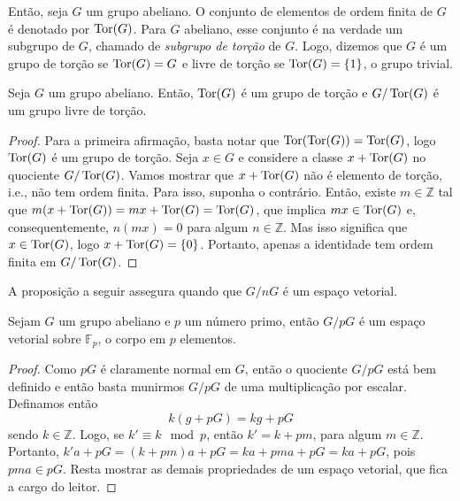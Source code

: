     	\par\vspace{0.3cm} Então, seja $G$ um grupo abeliano. O conjunto de elementos de ordem finita de 
    	$G$ é denotado por $\operatorname{Tor}(G)$. Para $G$ abeliano, esse conjunto é na verdade um subgrupo de $G$, 
    	chamado de \textit{subgrupo de torção} de $G$. Logo, dizemos que $G$ é um grupo de torção se 
    	$\operatorname{Tor}(G) = G$ e livre de torção se $\operatorname{Tor}(G) = \left\{1\right\}$, o grupo trivial.
    	\begin{lemma}
    	\label{quociente por tor}
    		Seja $G$ um grupo abeliano. Então, $\operatorname{Tor}(G)$ é um grupo de torção e $G/\operatorname{Tor}(G)$ é um 
    		grupo livre de torção.
    	\end{lemma}
    	\begin{proof}
    		Para a primeira afirmação, basta notar que $\operatorname{Tor}(\operatorname{Tor}(G)) = \operatorname{Tor}(G)$, logo $\operatorname{Tor}(G)$ é um grupo 
    		de torção. Seja $x\in G$ e considere a classe $x + \operatorname{Tor}(G)$ no quociente $G/\operatorname{Tor}(G)$. Vamos mostrar
    		que $x + \operatorname{Tor}(G)$ não é elemento de torção, i.e., não tem ordem finita. Para isso, suponha o
    		contrário. Então, existe $m\in\mathbb{Z}$ tal que $m( x+\operatorname{Tor}(G) ) = mx + \operatorname{Tor}(G) = \operatorname{Tor}(G)$, que
    		implica $mx\in\operatorname{Tor}(G)$ e, consequentemente, $n(mx) = 0$ para algum $n\in\mathbb{Z}$. Mas isso
    		significa que $x\in\operatorname{Tor}(G)$, logo $x+\operatorname{Tor}(G) = \left\{0\right\}$. Portanto, apenas a identidade tem
    		ordem finita em $G/\operatorname{Tor}(G)$. 
    	\end{proof}
    	A proposição a seguir assegura quando que $G/nG$ é um espaço vetorial.
    	\begin{prop}
    	\label{G/nG espaco vetorial}
    		Sejam $G$ um grupo abeliano e $p$ um número primo, então $G/pG$ é um espaço vetorial sobre
    		$\mathbb{F}_p$, o corpo em $p$ elementos.
    	\end{prop}
    	\begin{proof}
    		Como $pG$ é claramente normal em $G$, então o quociente $G/pG$ está bem definido e então basta
    		munirmos $G/pG$ de uma multiplicação por escalar. Definamos então
    		\begin{equation*}
    		    k(g+pG)  = kg + pG
    		\end{equation*}
    		sendo $k\in\mathbb{Z}$. Logo, se $k'\equiv k\mod p$, então $k' = k + pm$, para
    		algum $m\in\mathbb{Z}$. Portanto, $k'a + pG = (k+pm)a + pG = ka + pma + pG = ka + pG$, pois 
    		$pma\in pG$. Resta mostrar as demais propriedades de um espaço vetorial, que fica a cargo do leitor.
    	\end{proof}
